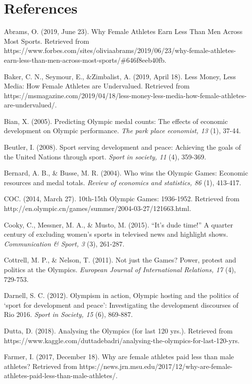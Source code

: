 \documentclass[12pt]{article}
\begin{document}
\section{References}
\begin{hangparas}{.25in}{1}
Abrams, O. (2019, June 23). Why Female Athletes Earn Less Than Men Across Most Sports. Retrieved from https://www.forbes.com/sites/oliviaabrams/2019/06/23/why-female-athletes-earn-less-than-men-across-most-sports/\#646f8eeb40fb.

Baker, C. N., Seymour, E., \&Zimbalist, A. (2019, April 18). Less Money, Less Media: How Female Athletes are Undervalued. Retrieved from https://msmagazine.com/2019/04/18/less-money-less-media-how-female-athletes-are-undervalued/.

Bian, X. (2005). Predicting Olympic medal counts: The effects of economic development on Olympic performance. \textit {The park place economist, 13} (1), 37-44. 

Beutler, I. (2008). Sport serving development and peace: Achieving the goals of the United Nations through sport. \textit {Sport in society, 11} (4), 359-369.

Bernard, A. B., \& Busse, M. R. (2004). Who wins the Olympic Games: Economic resources and medal totals. \textit {Review of economics and statistics, 86} (1), 413-417.

COC. (2014, March 27). 10th-15th Olympic Games: 1936-1952. Retrieved from http://en.olympic.cn/games/summer/2004-03-27/121663.html. 

Cooky, C., Messner, M. A., \& Musto, M. (2015). “It’s dude time!” A quarter century of excluding women’s sports in televised news and highlight shows. \textit {Communication \& Sport, 3} (3), 261-287.

Cottrell, M. P., & Nelson, T. (2011). Not just the Games? Power, protest and politics at the Olympics. \textit {European Journal of International Relations, 17} (4), 729-753.

Darnell, S. C. (2012). Olympism in action, Olympic hosting and the politics of ‘sport for development and peace’: Investigating the development discourses of Rio 2016. \textit {Sport in Society, 15} (6), 869-887.

Dutta, D. (2018). Analysing the Olympics (for last 120 yrs.). Retrieved from https://www.kaggle.com/duttadebadri/analysing-the-olympics-for-last-120-yrs.

Farmer, I. (2017, December 18). Why are female athletes paid less than male athletes? Retrieved from https://news.jrn.msu.edu/2017/12/why-are-female-athletes-paid-less-than-male-athletes/.


\end{hangparas}
\end{document}

